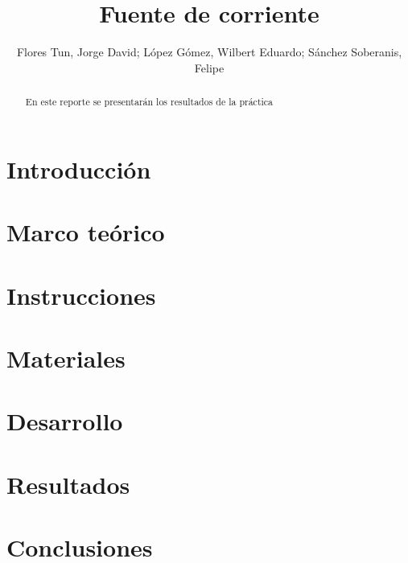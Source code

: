 \documentclass[]{article}
\title{Fuente de corriente}
\author{Flores Tun, Jorge David; López Gómez, Wilbert Eduardo; Sánchez Soberanis, Felipe}
\begin{document}
\maketitle

\begin{abstract}
    En este reporte se presentarán los resultados de la práctica 
\end{abstract}

\section{Introducción}

\section{Marco teórico}

\section{Instrucciones}

\section{Materiales}

\section{Desarrollo}

\section{Resultados}

\section{Conclusiones}


\end{document}
